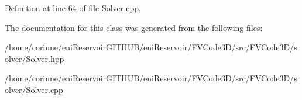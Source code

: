 Definition at line \hyperlink{Solver_8cpp_source_l00064}{64} of file \hyperlink{Solver_8cpp_source}{Solver.\+cpp}.



The documentation for this class was generated from the following files\+:\begin{DoxyCompactItemize}
\item 
/home/corinne/eni\+Reservoir\+G\+I\+T\+H\+U\+B/eni\+Reservoir/\+F\+V\+Code3\+D/src/\+F\+V\+Code3\+D/solver/\hyperlink{Solver_8hpp}{Solver.\+hpp}\item 
/home/corinne/eni\+Reservoir\+G\+I\+T\+H\+U\+B/eni\+Reservoir/\+F\+V\+Code3\+D/src/\+F\+V\+Code3\+D/solver/\hyperlink{Solver_8cpp}{Solver.\+cpp}\end{DoxyCompactItemize}

